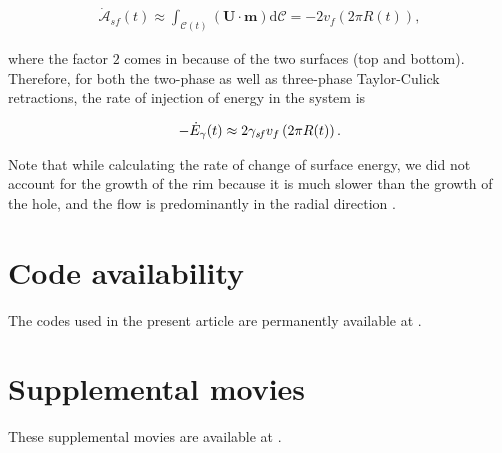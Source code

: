 \begin{subappendices}
	\begin{align}
		\label{Eqn::Gammadot2}
		\dot{\mathcal{A}}_{sf}(t) \approx \int_{\mathcal{C}(t)}\left(\boldsymbol{U}\cdot\boldsymbol{m}\right)\mathrm{d}\mathcal{C} = -2v_f\left(2\pi R(t)\right),
	\end{align} 
	
	\noindent where the factor $2$ comes in because of the two surfaces (top and bottom). Therefore, for both the two-phase as well as three-phase Taylor-Culick retractions, the rate of injection of energy in the system is
	
	\begin{align}
		\label{Eqn::Egammadot3}
		-\dot{E}_\gamma(t) \approx 2\gamma_\mathit{sf} v_f\left(2\pi R(t)\right).
	\end{align} 
	
	\noindent Note that while calculating the rate of change of surface energy, we did not account for the growth of the rim because it is much slower than the growth of the hole, and the flow is predominantly in the radial direction \citep[see figures~\ref{Ch6:fig:two-phaseTemporal2} and~\ref{Ch6:fig:three-phaseTemporal2}, and][]{gordillo2011asymptotic}.
	
	\section{Code availability}
	The codes used in the present article are permanently available at \citet{basiliskvatsaltc}.
	
	\section{Supplemental movies}
	These supplemental movies are available at \citet[\href{https://youtube.com/playlist?list=PLf5C5HCrvhLHsSDmgLAql-hcAEZrejs2V}{external YouTube link,}][]{vatsalTCsuppl}. 
	

\end{subappendices}
